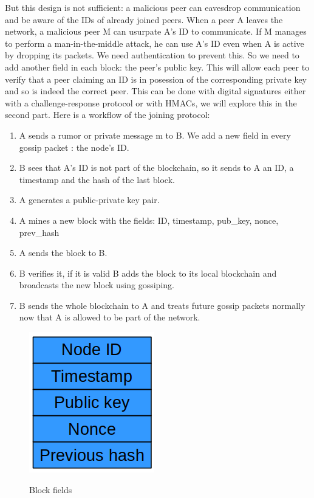 \documentclass[twocolumn]{article}
\begin{document}
\linebreak
\linebreak
But this design is not sufficient: a malicious peer can eavesdrop communication and be aware of the IDs of already joined peers. When a peer A leaves the network, a malicious peer M can usurpate A’s ID to communicate. If M manages to perform a man-in-the-middle attack, he can use A’s ID even when A is active by dropping its packets. We need authentication to prevent this. So we need to add another field in each block: the peer’s public key. This will allow each peer to verify that a peer claiming an ID is in posession of the corresponding private key and so is indeed the correct peer. This can be done with digital signatures either with a challenge-response protocol or with HMACs, we will explore this in the second part.
\linebreak
\linebreak
Here is a workflow of the joining protocol:
\begin{enumerate}
	\item A sends a rumor or private message m to B. We add a new field in every gossip packet : the node's ID.
	\item B sees that A’s ID is not part of the blockchain, so it sends to A an ID, a timestamp and the hash of the last block.
	\item A generates a public-private key pair.
	\item A mines a new block with the fields: ID, timestamp, pub\_key, nonce, prev\_hash
	\item A sends the block to B.
	\item B verifies it, if it is valid B adds the block to its local blockchain and broadcasts the new block using gossiping.
	\item B sends the whole blockchain to A and treats future gossip packets normally now that A is allowed to be part of the network.
\end{enumerate}
\begin{figure}[h]
	\caption{Block fields}
	\centering
	\includegraphics[scale=0.7]{block}
	\label{fig:block}
\end{figure}
\end{document}
